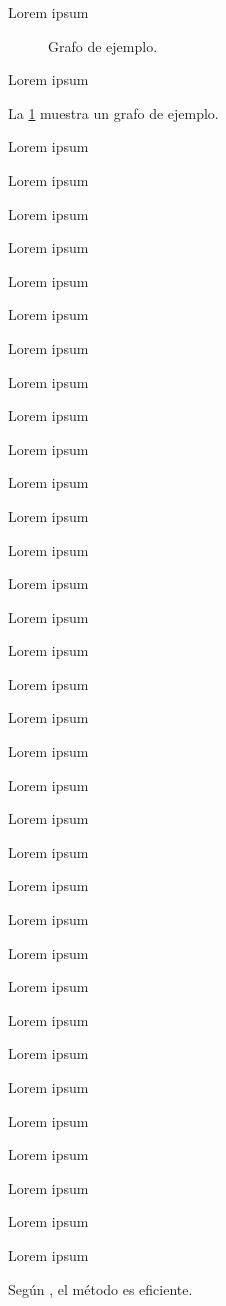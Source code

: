 Lorem ipsum 

\begin{figure}[h]
    \centering
    \caption{Grafo de ejemplo.}
    \label{fig:grafo}
\end{figure}

Lorem ipsum 

La \cref{fig:grafo} muestra un grafo de ejemplo.

Lorem ipsum 

Lorem ipsum 

Lorem ipsum 

Lorem ipsum 

Lorem ipsum 

Lorem ipsum 

Lorem ipsum 

Lorem ipsum 

Lorem ipsum 

Lorem ipsum 

Lorem ipsum 

Lorem ipsum 

Lorem ipsum 

Lorem ipsum 

Lorem ipsum 

Lorem ipsum 

Lorem ipsum 

Lorem ipsum 

Lorem ipsum 

Lorem ipsum 

Lorem ipsum 

Lorem ipsum 

Lorem ipsum 

Lorem ipsum 

Lorem ipsum 

Lorem ipsum 

Lorem ipsum 

Lorem ipsum 

Lorem ipsum 

Lorem ipsum 

Lorem ipsum 

Lorem ipsum 

Lorem ipsum 

Lorem ipsum 

Según \textcite{apellido2023}, el método es eficiente.
